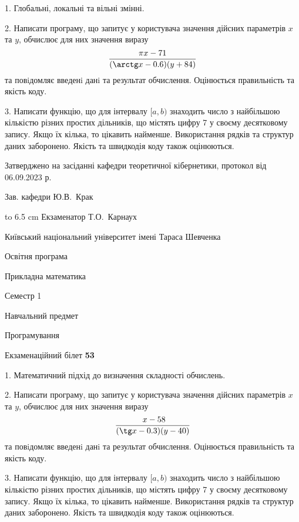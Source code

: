 \documentclass[12pt, ukrainian]{article}
\begin{document}
{%
1. Глобальні, локальні та вільні змінні.%
\par
2. Написати програму, що запитує у користувача значення дійсних параметрів $x$ та $y$, обчислює для них значення виразу 
$$\frac{\pi x - 71}{(\arctg x - 0.6) (y + 84)}$$ 
та повiдомляє введенi данi та результат обчислення.
 Оцінюється правильність та якість коду.

\par
3. Написати функцію, що для інтервалу $[a, b)$ знаходить число з найбільшою кількістю різних простих дільників, що містять цифру 7 у своєму десятковому запису. Якщо їх кілька, то цікавить найменше.  Використання рядків та структур даних заборонено. Якість та швидкодія коду також оцінюються. 

}
{\smallskip\smallskip \begin {scriptsize} Затверджено на засіданні кафедри теоретичної кібернетики, протокол   від   06.09.2023 р.\par\smallskip\smallskip\smallskip\smallskip
{\parbox {6.5 cm} {Зав. кафедри \dotfill Ю.В.~Крак}}\hspace {0.7cm} {\hbox to 6.5 cm { Екзаменатор \dotfill Т.О.~Карнаух}} \end{scriptsize}}
\vspace{0.9cm}
{{\begin {scriptsize}\par
{ \center  Київський національний університет імені Тараса Шевченка \par}
{\parbox {5 cm}{Освітня програма \hfill}{\parbox {7 cm}{Прикладна математика\hfill}}\parbox {6 cm}{\hfill Семестр 1}}\par
{\parbox {5 cm} {Навчальний предмет \hfill}\parbox {7 cm}{Програмування \hfill}\parbox {6cm}{\hfill}\par}\vspace{-15pt} \end{scriptsize}}{\center Екзаменаційний білет \No \textbf { 53 }\par}}
{%
1. Математичний підхід до визначення складності обчислень.%
\par
2. Написати програму, що запитує у користувача значення дійсних параметрів $x$ та $y$, обчислює для них значення виразу 
$$\frac{\ x - 58}{(\tg x - 0.3) (y - 40)}$$ 
та повiдомляє введенi данi та результат обчислення.
 Оцінюється правильність та якість коду.

\par
3. Написати функцію, що для інтервалу $[a, b)$ знаходить число з найбільшою кількістю різних простих дільників, що містять цифру 7 у своєму десятковому запису. Якщо їх кілька, то цікавить найменше.  Використання рядків та структур даних заборонено. Якість та швидкодія коду також оцінюються. 

}
\end{document}
